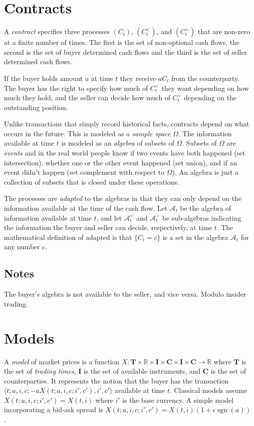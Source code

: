 \documentclass[12pt,letterpaper,fleqn]{report}
\DeclareMathOperator{\sgn}{sgn}
\begin{document}
\section{Contracts}
A {\em contract} specifies three processes \((C_t)\), \((C^<_t)\),
and \((C^>_t)\) that are non-zero at a finite number of times. The first is
the set of non-optional cash flows, the second is the set of buyer determined
cash flows and the third is the set of seller determined cash flows.

If the buyer holds amount \(a\) at time \(t\) they receive \(aC_t\) from
the counterparty. The buyer has the right to specify how much of
\(C^<_t\) they want depending on how much they hold, and the seller
can decide how much of \(C^>_t\) depending on the outstanding position.

Unlike transactions that simply record historical facts, contracts depend on
what occurs in the future. This is modeled as a {\em sample space} \(\Omega\).
The information available at time \(t\) is modeled as an {\em algebra} of
subsets of \(\Omega\). Subsets of \(\Omega\) are {\em events} and in the real
world people know if two events have both happened (set intersection), 
whether one or the other event happened (set union), and if an event didn't
happen (set complement with respect to \(\Omega\)). An algebra is just a collection
of subsets that is closed under these operations.

The processes are {\em adapted} to the algebras in that they can only depend
on the information available at the time of the cash flow.
Let \(\mathcal{A}_t\) be the algebra of information available
at time \(t\), and 
let \(\mathcal{A}^<_t\) and \(\mathcal{A}^>_t\) 
be sub-algebras indicating the information the
buyer and seller can decide, respectively, at time \(t\).
The mathematical definition of adapted is that \(\{C_t = c\}\) is
a set in the algebra \(\mathcal{A}_t\) for any number \(c\).

\subsection{Notes}
The buyer's algebra is not available to the seller, and vice versa. Modulo insider trading.

\section{Models}
A {\em model} of market prices is a function 
\(X\colon \mathbf{T}\times\mathbb{R}\times\mathbf{I}\times\mathbf{C}
\times\mathbf{I}\times\mathbf{C}\to\mathbb{R}\) where \(\mathbf{T}\) is the set of {\em trading times},
\(\mathbf{I}\) is the set of available
instruments, and \(\mathbf{C}\) is the set of counterparties. It represents the
notion that the buyer has the transaction
\(\langle t;a,i,c;-aX(t;a,i,c;i',c'),i',c'\rangle\) available at time \(t\).
Classical models assume 
\(X(t;a,i,c;i',c') = X(t,i)\) where \(i'\) is the base currency.
A simple model incorporating a bid-ask spread is
\(X(t;a,i,c;i',c') = X(t,i)(1 + \epsilon\sgn(a))\).
\end{document}
